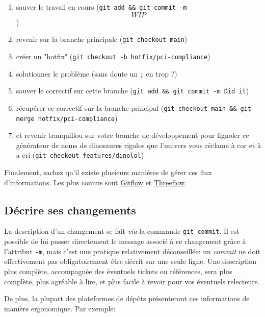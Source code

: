 \documentclass[11pt]{amsbook}
\begin{document}
\begin{enumerate}

\item{sauver le travail en cours (\texttt{git add \. \&\& git commit -m \[WIP\]})}

\item{revenir sur la branche principale (\texttt{git checkout main})}

\item{créer un "hotfix" (\texttt{git checkout -b hotfix/pci-compliance})}

\item{solutionner le problème (sans doute un \texttt{;} en trop ?)}

\item{sauver le correctif sur cette branche (\texttt{git add \. \&\& git commit -m \"Did it\!\"})}

\item{récupérer ce correctif sur la branche principal (\texttt{git checkout main \&\& git merge hotfix/pci-compliance})}

\item{et revenir tranquillou sur votre branche de développement pour fignoler ce générateur de noms de dinosaures rigolos que l’univers vous réclame à cor et à a cri (\texttt{git checkout features/dinolol})}

\end{enumerate}


Finalement, sachez qu’il existe plusieurs manières de gérer ces flux d’informations.
Les plus connus sont \href{https://www.gitflow.com/}{Gitflow} et \href{https://www.reddit.com/r/programming/comments/7mfxo6/a_branching_strategy_simpler_than_gitflow/}{Threeflow}.


\hypertarget{x-décrire-ses-changements}{\subsection{Décrire ses changements}}
La description d’un changement se fait \emph{via} la commande \texttt{git commit}.
Il est possible de lui passer directement le message associé à ce changement grâce à l’attribut \texttt{-m}, mais c’est une pratique relativement déconseillée: un \emph{commit} ne doit effectivement pas obligatoirement être décrit sur une seule ligne.
Une description plus complète, accompagnée des éventuels tickets ou références, sera plus complète, plus agréable à lire, et plus facile à revoir pour vos éventuels relecteurs.


De plus, la plupart des plateformes de dépôts présenteront ces informations de manière ergonomique. Par exemple:
\end{document}
